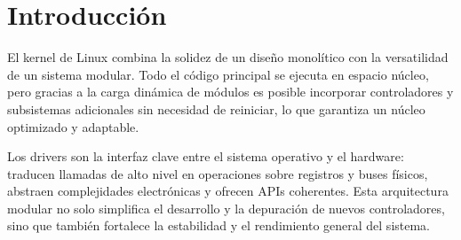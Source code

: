 \documentclass[a4paper,12pt]{article}
\begin{document}



\tableofcontents
\clearpage

\section{Introducción}
El kernel de Linux combina la solidez de un diseño monolítico con la versatilidad de un sistema modular. Todo el código principal se ejecuta en espacio núcleo, pero gracias a la carga dinámica de módulos es posible incorporar controladores y subsistemas adicionales sin necesidad de reiniciar, lo que garantiza un núcleo optimizado y adaptable.

Los drivers son la interfaz clave entre el sistema operativo y el hardware: traducen llamadas de alto nivel en operaciones sobre registros y buses físicos, abstraen complejidades electrónicas y ofrecen APIs coherentes. Esta arquitectura modular no solo simplifica el desarrollo y la depuración de nuevos controladores, sino que también fortalece la estabilidad y el rendimiento general del sistema.





\end{document}
